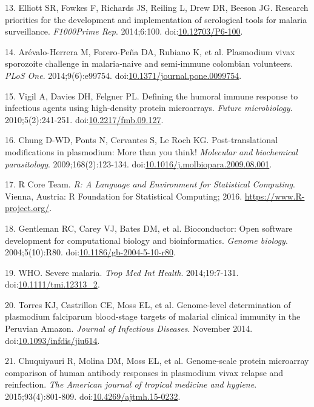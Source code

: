 \documentclass[]{article}
\begin{document}
\hypertarget{ref-elliott2014}{}
13. Elliott SR, Fowkes F, Richards JS, Reiling L, Drew DR, Beeson JG.
Research priorities for the development and implementation of
serological tools for malaria surveillance. \emph{F1000Prime Rep}.
2014;6:100. doi:\href{https://doi.org/10.12703/P6-100}{10.12703/P6-100}.

\hypertarget{ref-arevalo2014}{}
14. Arévalo-Herrera M, Forero-Peña DA, Rubiano K, et al. Plasmodium
vivax sporozoite challenge in malaria-naive and semi-immune colombian
volunteers. \emph{PLoS One}. 2014;9(6):e99754.
doi:\href{https://doi.org/10.1371/journal.pone.0099754}{10.1371/journal.pone.0099754}.

\hypertarget{ref-vigil2010}{}
15. Vigil A, Davies DH, Felgner PL. Defining the humoral immune response
to infectious agents using high-density protein microarrays.
\emph{Future microbiology}. 2010;5(2):241-251.
doi:\href{https://doi.org/10.2217/fmb.09.127}{10.2217/fmb.09.127}.

\hypertarget{ref-leroch2009postmod}{}
16. Chung D-WD, Ponts N, Cervantes S, Le Roch KG. Post-translational
modifications in plasmodium: More than you think! \emph{Molecular and
biochemical parasitology}. 2009;168(2):123-134.
doi:\href{https://doi.org/10.1016/j.molbiopara.2009.08.001}{10.1016/j.molbiopara.2009.08.001}.

\hypertarget{ref-R2016}{}
17. R Core Team. \emph{R: A Language and Environment for Statistical
Computing}. Vienna, Austria: R Foundation for Statistical Computing;
2016. \url{https://www.R-project.org/}.

\hypertarget{ref-bioconductor2004}{}
18. Gentleman RC, Carey VJ, Bates DM, et al. Bioconductor: Open software
development for computational biology and bioinformatics. \emph{Genome
biology}. 2004;5(10):R80.
doi:\href{https://doi.org/10.1186/gb-2004-5-10-r80}{10.1186/gb-2004-5-10-r80}.

\hypertarget{ref-WHO2014severe}{}
19. WHO. Severe malaria. \emph{Trop Med Int Health}. 2014;19:7-131.
doi:\href{https://doi.org/10.1111/tmi.12313_2}{10.1111/tmi.12313\_2}.

\hypertarget{ref-Torres2014asymptomatic}{}
20. Torres KJ, Castrillon CE, Moss EL, et al. Genome-level determination
of plasmodium falciparum blood-stage targets of malarial clinical
immunity in the Peruvian Amazon. \emph{Journal of Infectious Diseases}.
November 2014.
doi:\href{https://doi.org/10.1093/infdis/jiu614}{10.1093/infdis/jiu614}.

\hypertarget{ref-chuquiyauri2015vivax}{}
21. Chuquiyauri R, Molina DM, Moss EL, et al. Genome-scale protein
microarray comparison of human antibody responses in plasmodium vivax
relapse and reinfection. \emph{The American journal of tropical medicine
and hygiene}. 2015;93(4):801-809.
doi:\href{https://doi.org/10.4269/ajtmh.15-0232}{10.4269/ajtmh.15-0232}.
\end{document}
